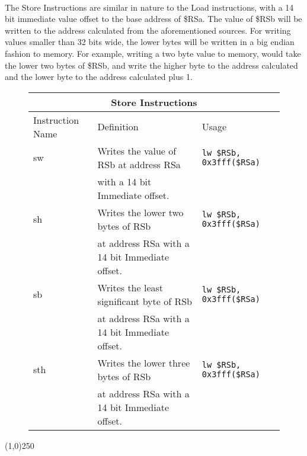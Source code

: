 \documentclass[letterpaper, 11pt]{article}
\begin{document}
\paragraph{} The Store Instructions are similar in nature to the Load instructions, with a 14 bit immediate value offset to the base address of \$RSa.
The value of \$RSb will be written to the address calculated from the aforementioned sources. For writing values smaller than 32 bits wide, the lower
bytes will be written in a big endian fashion to memory. For example, writing a two byte value to memory, would take the lower two bytes of \$RSb, and write
the higher byte to the address calculated and the lower byte to the address calculated plus 1. 
\begin{figure}[!h]
	\begin{center}
		\begin{tabular}{|l|l|l|}
			\hline
			\multicolumn{3}{c}{Store Instructions} \\ \hline
			Instruction Name	& Definition											& Usage 							\\ \hline
			sw					& Writes the value of RSb at address RSa				& \texttt{lw \$RSb, 0x3fff(\$RSa)}	\\ 
			\hfill				& with a 14 bit Immediate offset.						& \hfill 							\\ \hline
			sh					& Writes the lower two bytes of RSb 					& \texttt{lw \$RSb, 0x3fff(\$RSa)}	\\ 
			\hfill				& at address RSa with a 14 bit Immediate offset.		& \hfill 							\\ \hline
			sb					& Writes the least significant byte of RSb 				& \texttt{lw \$RSb, 0x3fff(\$RSa)}	\\ 
			\hfill				& at address RSa with a 14 bit Immediate offset.		& \hfill 							\\ \hline
			sth					& Writes the lower three bytes of RSb 					& \texttt{lw \$RSb, 0x3fff(\$RSa)}	\\ 
			\hfill				& at address RSa with a 14 bit Immediate offset.		& \hfill 							\\ \hline
		 		\end{tabular} 
	\end{center}
	
\end{figure}

\begin{center}
	\line(1,0){250}
\end{center}
\clearpage
\end{document}
